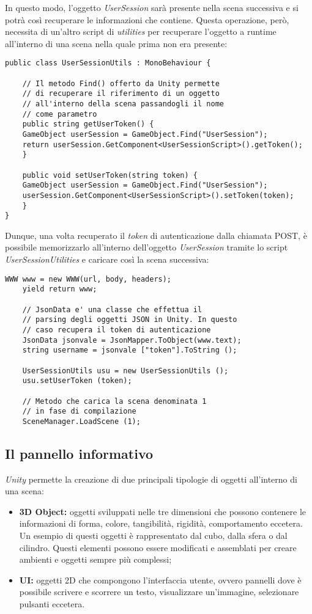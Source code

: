 In questo modo, l'oggetto \textit{UserSession} sarà presente nella scena successiva e si potrà così recuperare le informazioni che contiene. Questa operazione, però, necessita di un'altro script di \textit{utilities} per recuperare l'oggetto a runtime all'interno di una scena nella quale prima non era presente:

\begin{lstlisting}[style=MyCStyle]
public class UserSessionUtils : MonoBehaviour {

	// Il metodo Find() offerto da Unity permette 
	// di recuperare il riferimento di un oggetto
	// all'interno della scena passandogli il nome
	// come parametro
	public string getUserToken() {
	GameObject userSession = GameObject.Find("UserSession");
	return userSession.GetComponent<UserSessionScript>().getToken();
	}

	public void setUserToken(string token) {
	GameObject userSession = GameObject.Find("UserSession");
	userSession.GetComponent<UserSessionScript>().setToken(token);
	}
}
\end{lstlisting}

Dunque, una volta recuperato il \textit{token} di autenticazione dalla chiamata POST, è possibile memorizzarlo all'interno dell'oggetto \textit{UserSession} tramite lo script \textit{UserSessionUtilities} e caricare così la scena successiva:

\begin{lstlisting}[style=MyCStyle]
	WWW www = new WWW(url, body, headers);
	yield return www;
	
	// JsonData e' una classe che effettua il  
	// parsing degli oggetti JSON in Unity. In questo  
	// caso recupera il token di autenticazione
	JsonData jsonvale = JsonMapper.ToObject(www.text);
	string username = jsonvale ["token"].ToString ();
	
	UserSessionUtils usu = new UserSessionUtils ();
	usu.setUserToken (token);
	
	// Metodo che carica la scena denominata 1
	// in fase di compilazione
	SceneManager.LoadScene (1);
\end{lstlisting}

\hypertarget{3.3.2}{\subsection{Il pannello informativo}}
\textit{Unity} permette la creazione di due principali tipologie di oggetti all'interno di una scena:

\begin{itemize}
	\item \textbf{3D Object:} oggetti sviluppati nelle tre dimensioni che possono contenere le informazioni di forma, colore, tangibilità, rigidità, comportamento eccetera. \\
	Un esempio di questi oggetti è rappresentato dal cubo, dalla sfera o dal cilindro. Questi elementi possono essere modificati e assemblati per creare ambienti e oggetti sempre più complessi;
	\item \textbf{UI:} oggetti 2D che compongono l'interfaccia utente, ovvero pannelli dove è possibile scrivere e scorrere un testo, visualizzare un'immagine, selezionare pulsanti eccetera.
\end{itemize}

